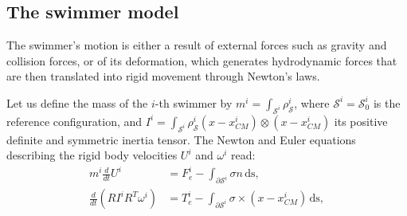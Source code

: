 \documentclass[graybox]{svmult}
\newcommand{\Real}{\mathbb{R}} %
\newcommand{\Density}{\rho} %
\newcommand{\tvel}{U} %
\newcommand{\angvel}{\omega} %
\newcommand{\Rmat}{R} %
\newcommand{\Inertia}{I} %
\newcommand{\mass}{m} %
\newcommand{\CenterMassi}{x_{CM}^i}
\newcommand{\Solid}{\mathcal{S}} %
\newcommand{\normal}{n} %
\begin{document}

\subsection{The swimmer model}


The swimmer's motion is either a result of external forces such as gravity and collision forces, or of its deformation, which generates hydrodynamic forces that are then translated into rigid movement through Newton's laws.

Let us define the mass of the $i$-th swimmer by  $\mass^i = \int_{\Solid^i} \Density_{\Solid}^i$, where $\Solid^i = \Solid^i_0$ is the reference configuration, %
and $\Inertia^i = \int_{\Solid^i} \Density_{\Solid}^i (x-\CenterMassi) \otimes (x-\CenterMassi)$ 
its positive definite and symmetric inertia tensor. 
The Newton and Euler equations describing the rigid body velocities $\tvel^i$ and $\angvel^i$ read:
\begin{equation}
	\begin{aligned}
		\mass^i \frac{d}{dt}\tvel^i &= F_e^i -\int_{\partial \Solid^i} \sigma \normal \,\textrm{ds},\\
		\frac{d}{dt}(\Rmat \Inertia^i \Rmat^T \angvel^i) &= T_e^i -\int_{\partial \Solid^i} \sigma \times (x-\CenterMassi)\,\textrm{ds}, 
	\end{aligned}
	\label{Eq:RB}
\end{equation}
\end{document}
